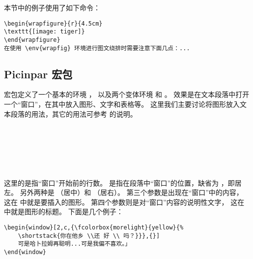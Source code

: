 本节中的例子使用了如下命令：
\begin{lstlisting}
\begin{wrapfigure}{r}{4.5cm}
\texttt{[image: tiger]}
\end{wrapfigure}
在使用 \env{wrapfig} 环境进行图文绕排时需要注意下面几点：...
\end{lstlisting}


\subsection{Picinpar 宏包}\label{ssec:picinpar}

 宏包定义了一个基本的环境 ，
以及两个变体环境  和 。
效果是在文本段落中打开一个“窗口”，在其中放入图形、文字和表格等。
这里我们主要讨论将图形放入文本段落的用法，其它的用法可参考  的说明。

\begin{flushleft}
\\
\qquad{}\\
\end{flushleft}

\begin{flushleft}
	\\
	\qquad{}\\
\end{flushleft}

这里的是指“窗口”开始前的行数。
是指在段落中“窗口”的位置，缺省为 ，即居左。
另外两种是 （居中）和 （居右）。
第三个参数是出现在“窗口”中的内容，
这在  中就是要插入的图形。
第四个参数则是对“窗口”内容的说明性文字，
这在  中就是图形的标题。
下面是几个例子：

\begin{lstlisting}
\begin{window}[2,c,{\fcolorbox{morelight}{yellow}{%
	\shortstack{你在他乡 \\还 好 \\ 吗？}}},{}]
	可是哈卜拉姆再聪明...可是我偏不喜欢。」
\end{window}
\end{lstlisting}

